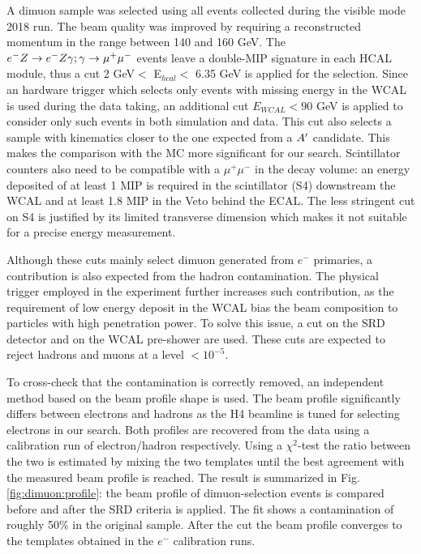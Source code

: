 A dimuon sample was selected using all events collected during the visible mode 2018 run. The beam quality was improved by requiring a reconstructed momentum in the range between 140 and 160 GeV. The $e^- Z \to e^- Z \gamma; \gamma \to \mu^+ \mu^-$ events leave a double-MIP signature in each HCAL module, thus a cut 2 GeV$<$ E$_{hcal} <$ 6.35 GeV is applied for the selection. Since an hardware trigger which selects only events with missing energy in the WCAL is used during the data taking, an additional cut $E_{WCAL} < 90$ GeV is applied to consider only such events in both simulation and data. This cut also selects a sample with kinematics closer to the one expected from a $A'$ candidate. This makes the comparison with the MC more significant for our search. Scintillator counters also need to be compatible with a $\mu^+ \mu^-$ in the decay volume: an energy deposited of at least 1 MIP is required in the scintillator (S4) downstream the WCAL and at least 1.8 MIP in the Veto behind the ECAL. The less stringent cut on S4 is justified by its limited transverse dimension which makes it not suitable for a precise energy measurement.

Although these cuts mainly select dimuon generated from $e^-$ primaries, a contribution is also expected from the hadron contamination. The physical trigger employed in the experiment further increases such contribution, as the requirement of low energy deposit in the WCAL bias the beam composition to particles with high penetration power. To solve this issue, a cut on the SRD detector and on the WCAL pre-shower are used. These cuts are expected to reject hadrons and muons at a level $<10^{-5}$.

To cross-check that the contamination is correctly removed, an independent method based on the beam profile shape is used. The beam profile significantly differs between electrons and hadrons as the H4 beamline is tuned for selecting electrons in our search. Both profiles are recovered from the data using a calibration run of electron/hadron respectively. Using a  $\chi^2$-test the ratio between the two is estimated by mixing the two templates until the best agreement with the measured beam profile is reached. The result is summarized in Fig.\ref{fig:dimuon:profile}: the beam profile of dimuon-selection events is compared before and after the SRD criteria is applied. The fit shows a contamination of roughly 50\% in the original sample. After the cut the beam profile converges to the templates obtained in the $e^-$ calibration runs.

